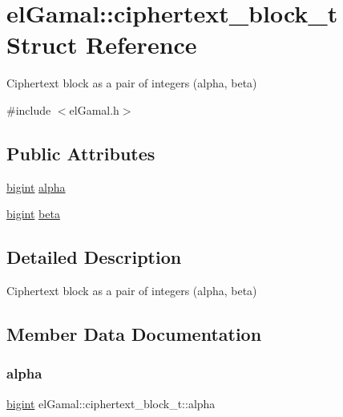 \hypertarget{structelGamal_1_1ciphertext__block__t}{}\section{el\+Gamal\+:\+:ciphertext\+\_\+block\+\_\+t Struct Reference}
\label{structelGamal_1_1ciphertext__block__t}


Ciphertext block as a pair of integers (alpha, beta)  




{\ttfamily \#include $<$el\+Gamal.\+h$>$}

\subsection*{Public Attributes}
\begin{DoxyCompactItemize}
\item 
\mbox{\hyperlink{namespaceelGamal_ab2883bf41ce8d738e2428c8ae81b0245}{bigint}} \mbox{\hyperlink{structelGamal_1_1ciphertext__block__t_a41374f56dc6f4eaf47a68e1ec0fd6028}{alpha}}
\item 
\mbox{\hyperlink{namespaceelGamal_ab2883bf41ce8d738e2428c8ae81b0245}{bigint}} \mbox{\hyperlink{structelGamal_1_1ciphertext__block__t_ab49b638b6d57044532b92dc6dece00af}{beta}}
\end{DoxyCompactItemize}


\subsection{Detailed Description}
Ciphertext block as a pair of integers (alpha, beta) 

\subsection{Member Data Documentation}
\mbox{\label{structelGamal_1_1ciphertext__block__t_a41374f56dc6f4eaf47a68e1ec0fd6028}} 
\subsubsection{\texorpdfstring{alpha}{alpha}}
{\footnotesize\ttfamily \mbox{\hyperlink{namespaceelGamal_ab2883bf41ce8d738e2428c8ae81b0245}{bigint}} el\+Gamal\+::ciphertext\+\_\+block\+\_\+t\+::alpha}

